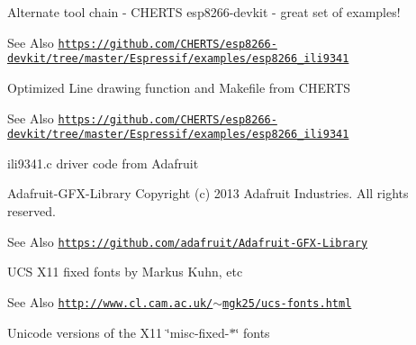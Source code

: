  \begin{DoxyParagraph}{Alternate tool chain -\/ C\-H\-E\-R\-T\-S esp8266-\/devkit -\/ great set of examples!}

\end{DoxyParagraph}
\begin{DoxySeeAlso}{See Also}
\href{https://github.com/CHERTS/esp8266-devkit/tree/master/Espressif/examples/esp8266_ili9341}{\tt https\-://github.\-com/\-C\-H\-E\-R\-T\-S/esp8266-\/devkit/tree/master/\-Espressif/examples/esp8266\-\_\-ili9341}
\end{DoxySeeAlso}


 \begin{DoxyParagraph}{Optimized Line drawing function and Makefile from C\-H\-E\-R\-T\-S}

\end{DoxyParagraph}
\begin{DoxySeeAlso}{See Also}
\href{https://github.com/CHERTS/esp8266-devkit/tree/master/Espressif/examples/esp8266_ili9341}{\tt https\-://github.\-com/\-C\-H\-E\-R\-T\-S/esp8266-\/devkit/tree/master/\-Espressif/examples/esp8266\-\_\-ili9341} 

 
\end{DoxySeeAlso}
\begin{DoxyParagraph}{ili9341.c driver code from Adafruit}

\end{DoxyParagraph}
\begin{DoxyParagraph}{Adafruit-\/\-G\-F\-X-\/\-Library Copyright (c) 2013 Adafruit Industries. }
All rights reserved. 
\end{DoxyParagraph}
\begin{DoxySeeAlso}{See Also}
\href{https://github.com/adafruit/Adafruit-GFX-Library}{\tt https\-://github.\-com/adafruit/\-Adafruit-\/\-G\-F\-X-\/\-Library} 

 
\end{DoxySeeAlso}
\begin{DoxyParagraph}{U\-C\-S X11 fixed fonts by Markus Kuhn, etc}

\end{DoxyParagraph}
\begin{DoxySeeAlso}{See Also}
\href{http://www.cl.cam.ac.uk/~mgk25/ucs-fonts.html}{\tt http\-://www.\-cl.\-cam.\-ac.\-uk/$\sim$mgk25/ucs-\/fonts.\-html}
\begin{DoxyItemize}
\item Unicode versions of the X11 \char`\"{}misc-\/fixed-\/$\ast$\char`\"{} fonts
\end{DoxyItemize}
\end{DoxySeeAlso}


